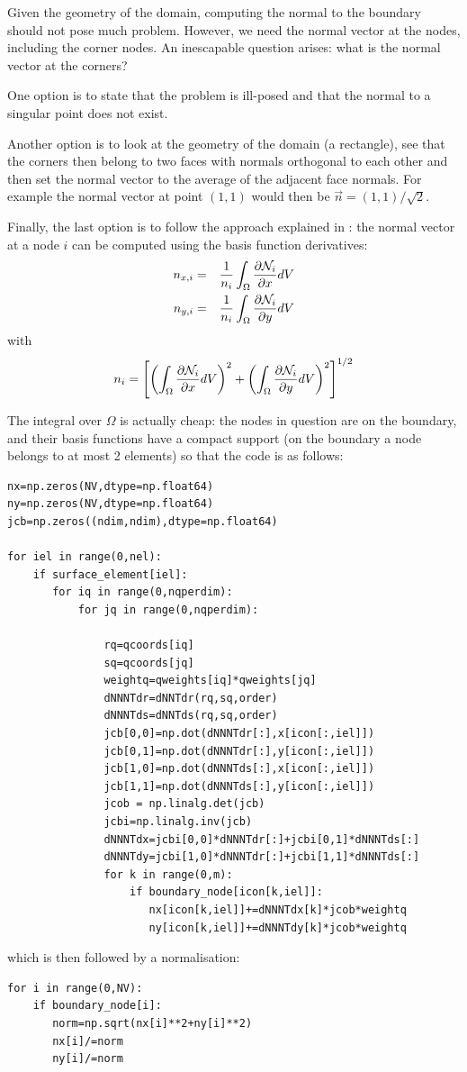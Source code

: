 Given the geometry of the domain, computing the normal to the boundary 
should not pose much problem. However, we need the normal vector at the nodes,
including the corner nodes. An inescapable question arises: 
what is the normal vector at the corners?

One option is to state that the problem is ill-posed and that the normal to a
singular point does not exist.

Another option is to look at the geometry of the domain (a rectangle), see that 
the corners then belong to two faces with normals orthogonal to each other 
and then set the normal vector to the average of the adjacent face normals.
For example the normal vector at point $(1,1)$ would then be $\vec{n}=(1,1)/\sqrt{2}$.

Finally, the last option is to follow the approach 
explained in \textcite{ensg82}: 
the normal vector at a node $i$ can be computed using the basis function derivatives:
\begin{eqnarray}
n_{x,i} &=& \frac{1}{n_i}\int_\Omega \frac{\partial {\mathcal{N}}_i}{\partial x} dV \nonumber\\
n_{y,i} &=& \frac{1}{n_i}\int_\Omega \frac{\partial {\mathcal{N}}_i}{\partial y} dV \nonumber
\end{eqnarray}
with 
\[
n_i = \left[
\left(\int_\Omega \frac{\partial {\mathcal{N}}_i}{\partial x} dV\right)^2 +
\left(\int_\Omega \frac{\partial {\mathcal{N}}_i}{\partial y} dV\right)^2 
\right]^{1/2}
\]

The integral over $\Omega$ is actually cheap: the nodes in question are on the boundary, 
and their basis functions have a compact support (on the boundary a node belongs to at 
most 2 elements) so that the code is as follows:

\begin{lstlisting}
nx=np.zeros(NV,dtype=np.float64) 
ny=np.zeros(NV,dtype=np.float64) 
jcb=np.zeros((ndim,ndim),dtype=np.float64)

for iel in range(0,nel):
    if surface_element[iel]: 
       for iq in range(0,nqperdim):
           for jq in range(0,nqperdim):

               rq=qcoords[iq]
               sq=qcoords[jq]
               weightq=qweights[iq]*qweights[jq]
               dNNNTdr=dNNTdr(rq,sq,order)
               dNNNTds=dNNTds(rq,sq,order)
               jcb[0,0]=np.dot(dNNNTdr[:],x[icon[:,iel]])
               jcb[0,1]=np.dot(dNNNTdr[:],y[icon[:,iel]])
               jcb[1,0]=np.dot(dNNNTds[:],x[icon[:,iel]])
               jcb[1,1]=np.dot(dNNNTds[:],y[icon[:,iel]])
               jcob = np.linalg.det(jcb)
               jcbi=np.linalg.inv(jcb)
               dNNNTdx=jcbi[0,0]*dNNNTdr[:]+jcbi[0,1]*dNNNTds[:]
               dNNNTdy=jcbi[1,0]*dNNNTdr[:]+jcbi[1,1]*dNNNTds[:]
               for k in range(0,m):
                   if boundary_node[icon[k,iel]]:
                      nx[icon[k,iel]]+=dNNNTdx[k]*jcob*weightq
                      ny[icon[k,iel]]+=dNNNTdy[k]*jcob*weightq
\end{lstlisting}
which is then followed by a normalisation:
\begin{lstlisting}
for i in range(0,NV):
    if boundary_node[i]:
       norm=np.sqrt(nx[i]**2+ny[i]**2)
       nx[i]/=norm
       ny[i]/=norm
\end{lstlisting}

